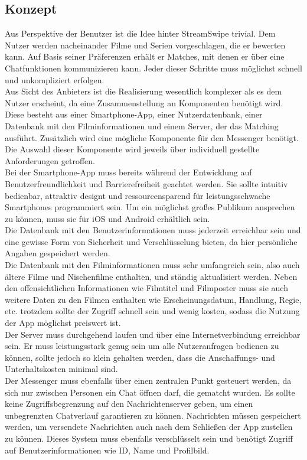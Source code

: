 \subsection{Konzept}
Aus Perspektive der Benutzer ist die Idee hinter StreamSwipe trivial. Dem Nutzer werden nacheinander Filme und Serien vorgeschlagen, die er bewerten kann. Auf Basis seiner Präferenzen erhält er Matches, mit denen er über eine Chatfunktionen kommunizieren kann. Jeder dieser Schritte muss möglichst schnell und unkompliziert erfolgen.\\
Aus Sicht des Anbieters ist die Realisierung wesentlich komplexer als es dem Nutzer erscheint, da eine Zusammenstellung an Komponenten benötigt wird.  Diese besteht aus einer Smartphone-App, einer Nutzerdatenbank, einer Datenbank mit den Filminformationen und einem Server, der das Matching ausführt. Zusätzlich wird eine mögliche Komponente für den Messenger benötigt. Die Auswahl dieser Komponente wird jeweils über individuell gestellte Anforderungen getroffen. \\

\noindent
Bei der Smartphone-App muss bereits während der Entwicklung auf Benutzerfreundlichkeit und Barrierefreiheit geachtet werden. Sie sollte intuitiv bedienbar, attraktiv designt und ressourcensparend für leistungsschwache Smartphones programmiert sein. Um ein möglichst großes Publikum ansprechen zu können, muss sie für iOS und Android erhältlich sein.\\
Die Datenbank mit den Benutzerinformationen muss jederzeit erreichbar sein und eine gewisse Form von Sicherheit und Verschlüsselung bieten, da hier persönliche Angaben gespeichert werden.\\
Die Datenbank mit den Filminformationen  muss sehr umfangreich sein, also auch ältere Filme und Nischenfilme enthalten, und ständig aktualisiert werden. Neben den offensichtlichen Informationen wie Filmtitel und Filmposter muss sie auch weitere Daten zu den Filmen enthalten wie Erscheinungsdatum, Handlung, Regie, etc. trotzdem sollte der Zugriff schnell sein und wenig kosten, sodass die Nutzung der App möglichst preiswert ist.\\
Der Server muss durchgehend laufen und über eine Internetverbindung erreichbar sein. Er muss leistungsstark genug sein um alle Nutzeranfragen bedienen zu können, sollte jedoch so klein gehalten werden, dass die Anschaffungs- und Unterhaltskosten minimal sind.\\
Der Messenger  muss ebenfalls über einen zentralen Punkt gesteuert werden, da sich nur zwischen Personen ein Chat öffnen darf, die gematcht wurden. Es sollte keine Zugriffsbegrenzung auf den Nachrichtenserver  geben, um einen unbegrenzten  Chatverlauf garantieren zu können. Nachrichten müssen gespeichert werden, um versendete Nachrichten auch nach dem Schließen der App zustellen zu können. Dieses System muss ebenfalls verschlüsselt sein und benötigt Zugriff auf Benutzerinformationen wie ID, Name und Profilbild. 



